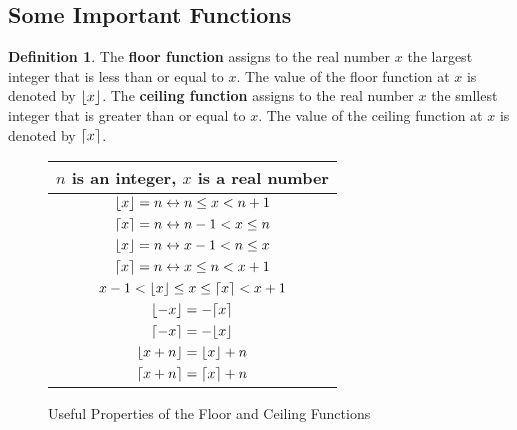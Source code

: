 \documentclass[article, 12pt]{article}
\theoremstyle{definition}
\newtheorem{definition}{Definition}[subsection]
\DeclarePairedDelimiter\ceil{\lceil}{\rceil} %
\DeclarePairedDelimiter\floor{\lfloor}{\rfloor} %
\newcommand{\lra}{\leftrightarrow} %
\begin{document}
    \subsection{Some Important Functions}
    \begin{definition}
        The \textbf{floor function} assigns to the real number $x$ the largest integer that is less than or equal to $x$. The value of the floor function at $x$ is denoted by $\floor*{x}$. The \textbf{ceiling function} assigns to the real number $x$ the smllest integer that is greater than or equal to $x$. The value of the ceiling function at $x$ is denoted by $\ceil*{x}$.
    \end{definition}
    \begin{figure}[H]
        \centering
        {\renewcommand{\arraystretch}{1.3}
        \begin{tabular}{|c|}
            \hline
            \textbf{$n$ is an integer, $x$ is a real number} \\
            \hline
            $\floor*{x} = n \lra n \leq x < n+1$ \\
            $\ceil*{x} = n \lra n-1 < x \leq n$ \\
            $\floor*{x} = n \lra x-1 < n \leq x$ \\
            $\ceil*{x} = n \lra x \leq n < x+1$ \\
            \hline
            $x-1 < \floor*{x} \leq x \leq \ceil*{x} < x+1$ \\
            \hline
            $\floor*{-x} = -\ceil*{x}$ \\
            $\ceil*{-x} = -\floor*{x}$ \\
            \hline
            $\floor*{x+n} = \floor*{x} + n$ \\
            $\ceil*{x+n} = \ceil*{x} + n$ \\
            \hline
        \end{tabular}}
        \caption{Useful Properties of the Floor and Ceiling Functions}
    \end{figure}
\end{document}
